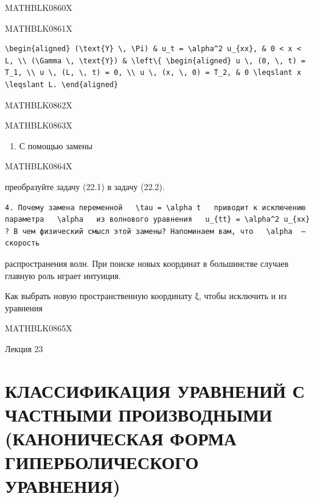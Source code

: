 \documentclass[
]{article}
\providecommand{\tightlist}{%
  \setlength{\itemsep}{0pt}\setlength{\parskip}{0pt}}
\begin{document}
{{MATHBLK0860X

MATHBLK0861X

\begin{verbatim}
\begin{aligned} (\text{Y} \, \Pi) & u_t = \alpha^2 u_{xx}, & 0 < x < L, \\ (\Gamma \, \text{Y}) & \left\{ \begin{aligned} u \, (0, \, t) = T_1, \\ u \, (L, \, t) = 0, \\ u \, (x, \, 0) = T_2, & 0 \leqslant x \leqslant L. \end{aligned}
\end{verbatim}

MATHBLK0862X

MATHBLK0863X

\begin{enumerate}
\def\labelenumi{\arabic{enumi}.}
\setcounter{enumi}{2}
\tightlist
\item
  С помощью замены
\end{enumerate}

MATHBLK0864X

преобразуйте задачу (22.1) в задачу (22.2).

\begin{verbatim}
4. Почему замена переменной   \tau = \alpha t   приводит к исключению параметра   \alpha   из волнового уравнения   u_{tt} = \alpha^2 u_{xx}  ? В чем физический смысл этой замены? Напоминаем вам, что   \alpha  —скорость
\end{verbatim}

распространения волн. При поиске новых координат в большинстве случаев
главную роль играет интуиция.

Как выбрать новую пространственную координату ξ, чтобы исключить и из
уравнения

MATHBLK0865X

Лекция 23

\section{КЛАССИФИКАЦИЯ УРАВНЕНИЙ С ЧАСТНЫМИ ПРОИЗВОДНЫМИ (КАНОНИЧЕСКАЯ
ФОРМА ГИПЕРБОЛИЧЕСКОГО
УРАВНЕНИЯ)}\label{ux43aux43bux430ux441ux441ux438ux444ux438ux43aux430ux446ux438ux44f-ux443ux440ux430ux432ux43dux435ux43dux438ux439-ux441-ux447ux430ux441ux442ux43dux44bux43cux438-ux43fux440ux43eux438ux437ux432ux43eux434ux43dux44bux43cux438-ux43aux430ux43dux43eux43dux438ux447ux435ux441ux43aux430ux44f-ux444ux43eux440ux43cux430-ux433ux438ux43fux435ux440ux431ux43eux43bux438ux447ux435ux441ux43aux43eux433ux43e-ux443ux440ux430ux432ux43dux435ux43dux438ux44f}

}}
\end{document}
